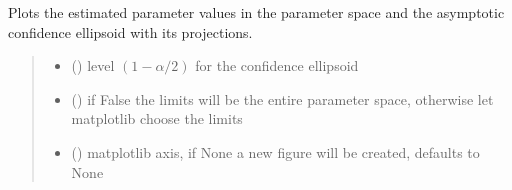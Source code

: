 \documentclass[letterpaper,10pt,english]{sphinxmanual}
\begin{document}
\begin{fulllineitems}
\begin{fulllineitems}
\begin{quote}
\begin{description}
\end{description}\end{quote}

\end{fulllineitems}


\begin{fulllineitems}
\label{\detokenize{cubmods:cubmods.cube.CUBresCUBE.plot3d}}
\pysigstartsignatures
{}
\pysigstopsignatures
\sphinxAtStartPar
Plots the estimated parameter values in the parameter space and
the asymptotic confidence ellipsoid with its projections.
\begin{quote}\begin{description}
\begin{itemize}
\item {} 
\sphinxAtStartPar
{} () \textendash{} level \((1-\alpha/2)\) for the confidence ellipsoid

\item {} 
\sphinxAtStartPar
{} () \textendash{} if False the limits will be the entire parameter space, otherwise let matplotlib choose the limits

\item {} 
\sphinxAtStartPar
{} (\sphinxstyleliteralemphasis{\sphinxupquote{, }}) \textendash{} matplotlib axis, if None a new figure will be created, defaults to None

\end{itemize}

\end{description}\end{quote}

\end{fulllineitems}



\end{fulllineitems}
\end{document}
